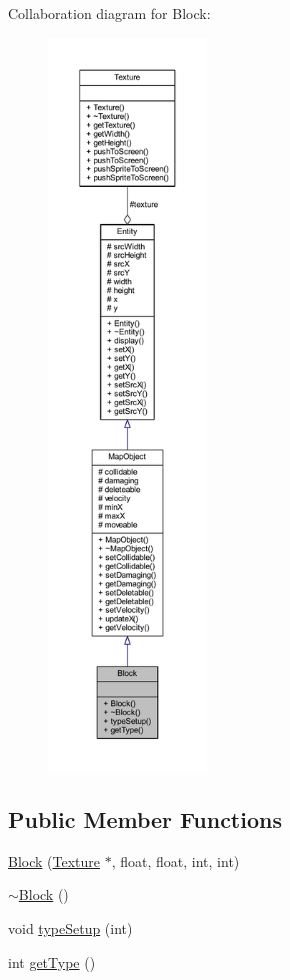 Collaboration diagram for Block\+:
\nopagebreak
\begin{figure}[H]
\begin{center}
\leavevmode
\includegraphics[height=550pt]{class_block__coll__graph}
\end{center}
\end{figure}
\subsection*{Public Member Functions}
\begin{DoxyCompactItemize}
\item 
\hyperlink{class_block_a3891a2f8968642512b5d2eeddc67131a}{Block} (\hyperlink{class_texture}{Texture} $\ast$, float, float, int, int)
\item 
\hyperlink{class_block_a19d1bd0e1cef6a865ed2745a2e648405}{$\sim$\+Block} ()
\item 
void \hyperlink{class_block_ae46fc2f3f732a601b6599bdc8250de3f}{type\+Setup} (int)
\item 
int \hyperlink{class_block_a87d881ecb3c498f68a5abff029b52188}{get\+Type} ()
\end{DoxyCompactItemize}
